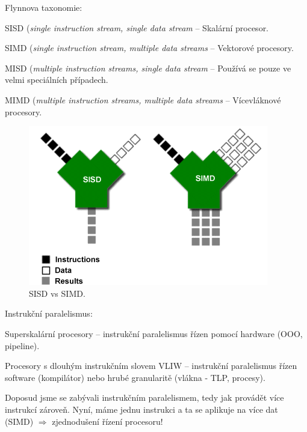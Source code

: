 \begin{compactitem}
    \item Flynnova taxonomie: \begin{compactitem}
        \item SISD (\textit{single instruction stream, single data stream} -- Skalární procesor.
        \item SIMD (\textit{single instruction stream, multiple data streams} -- Vektorové procesory.
        \item MISD (\textit{multiple instruction streams, single data stream} -- Používá se pouze ve velmi speciálních případech.
        \item MIMD (\textit{multiple instruction streams, multiple data streams} -- Vícevláknové procesory.
    \end{compactitem}

    \begin{figure}[H]
        \centering
        \includegraphics[width=0.6\linewidth]{sisd_simd.png}
        \caption{SISD vs SIMD.}
    \end{figure}

    \item Instrukční paralelismus: \begin{compactitem}
        \item Superskalární procesory -- instrukční paralelismus řízen pomocí hardware (\break OOO, pipeline).
        \item Procesory s dlouhým instrukčním slovem VLIW -- instrukční paralelismus řízen software (kompilátor) nebo hrubé granularitě (vlákna - TLP, procesy).
    \end{compactitem}

    \item Doposud jsme se zabývali instrukčním paralelismem, tedy jak provádět více instrukcí zároveň. Nyní, máme jednu instrukci a ta se aplikuje na více dat (SIMD) $\Rightarrow$ zjednodušení řízení procesoru!
\end{compactitem}

